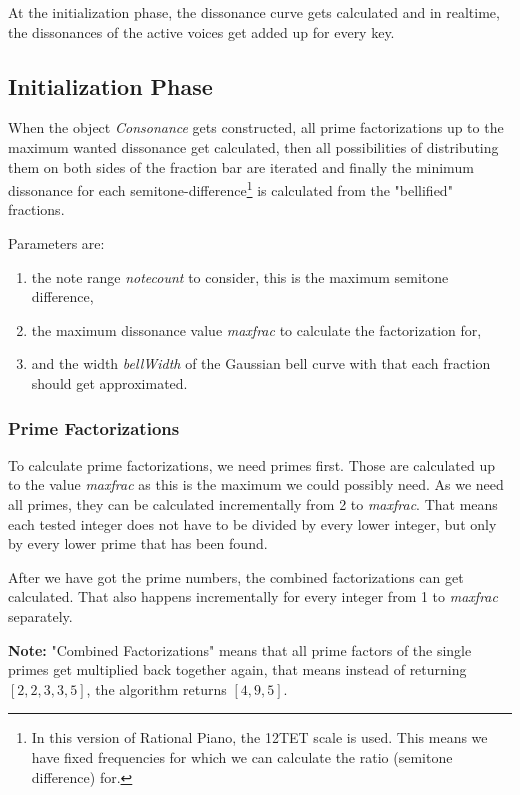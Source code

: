 \documentclass[12pt,a4paper,titlepage,oneside]{report}
\begin{document}
At the initialization phase, the dissonance curve gets calculated and in realtime, the dissonances of the active voices get added up for every key.


\subsection{Initialization Phase}

When the object \textit{Consonance} gets constructed, all prime factorizations up to the maximum wanted dissonance get calculated, then all possibilities of distributing them on both sides of the fraction bar are iterated and finally the minimum dissonance for each semitone-difference\footnote{In this version of Rational Piano, the 12TET scale is used. This means we have fixed frequencies for which we can calculate the ratio (semitone difference) for.} is calculated from the "bellified" fractions.

Parameters are:
\begin{enumerate}
	\item the note range \textit{notecount} to consider, this is the maximum semitone difference,
	\item the maximum dissonance value \textit{maxfrac} to calculate the factorization for,
	\item and the width \textit{bellWidth} of the Gaussian bell curve with that each fraction should get approximated.
\end{enumerate}


\subsubsection{Prime Factorizations}

To calculate prime factorizations, we need primes first. Those are calculated up to the value \textit{maxfrac} as this is the maximum we could possibly need. As we need all primes, they can be calculated incrementally from 2 to \textit{maxfrac}. That means each tested integer does not have to be divided by every lower integer, but only by every lower prime that has been found.

After we have got the prime numbers, the combined factorizations can get calculated. That also happens incrementally for every integer from 1 to \textit{maxfrac} separately.

\textbf{Note:} "Combined Factorizations" means that all prime factors of the single primes get multiplied back together again, that means instead of returning $[2,2,3,3,5]$, the algorithm returns $[4,9,5]$.
\end{document}

